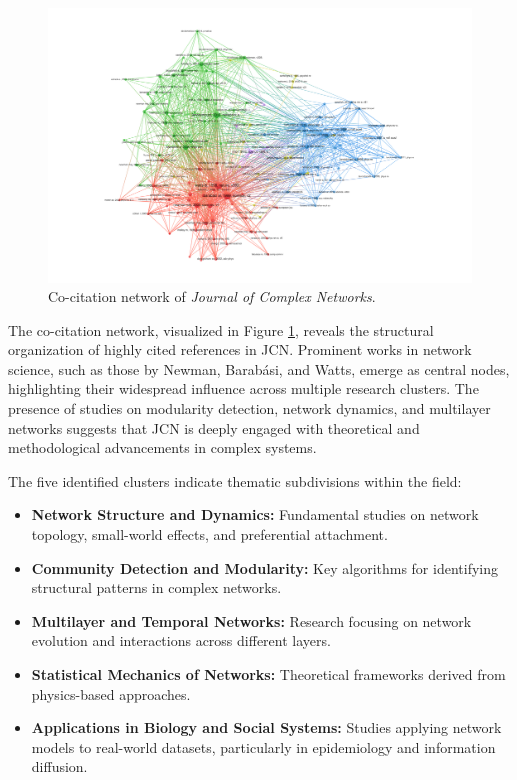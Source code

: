 \documentclass[twocolumn]{article}
\begin{document}
		\begin{figure}[htbp]
			\centering
			\includegraphics[width=\columnwidth]{"Journal of Complex Networks/VOS/Co-citation.pdf"}
			\caption{Co-citation network of \textit{Journal of Complex Networks}.}
			\label{fig.fig10}
		\end{figure}
		
		The co-citation network, visualized in Figure \ref{fig.fig10}, reveals the structural organization of highly cited references in JCN. Prominent works in network science, such as those by Newman, Barabási, and Watts, emerge as central nodes, highlighting their widespread influence across multiple research clusters. The presence of studies on modularity detection, network dynamics, and multilayer networks suggests that JCN is deeply engaged with theoretical and methodological advancements in complex systems.
		
		The five identified clusters indicate thematic subdivisions within the field:
		\begin{itemize}
			\item \textbf{Network Structure and Dynamics:} Fundamental studies on network topology, small-world effects, and preferential attachment.
			\item \textbf{Community Detection and Modularity:} Key algorithms for identifying structural patterns in complex networks.
			\item \textbf{Multilayer and Temporal Networks:} Research focusing on network evolution and interactions across different layers.
			\item \textbf{Statistical Mechanics of Networks:} Theoretical frameworks derived from physics-based approaches.
			\item \textbf{Applications in Biology and Social Systems:} Studies applying network models to real-world datasets, particularly in epidemiology and information diffusion.
		\end{itemize}
		
\end{document}
